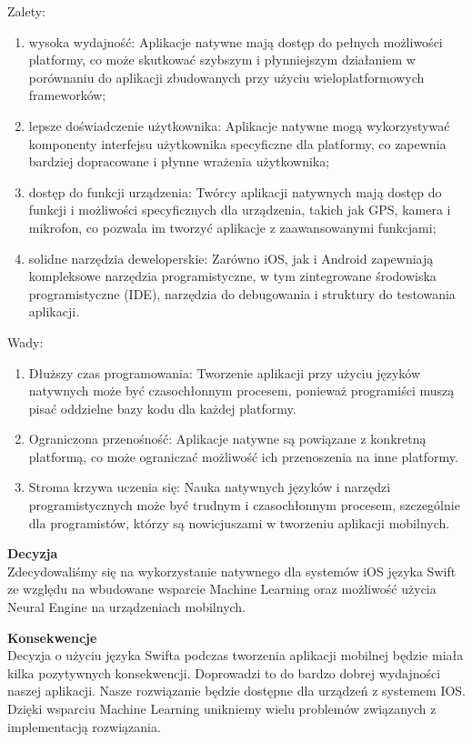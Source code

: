 \documentclass[12pt, a4paper, twoside, openany]{book}
\begin{document}
Zalety:
\begin{enumerate}[label=--]
    \item wysoka wydajność: Aplikacje natywne mają dostęp do pełnych możliwości platformy, co może skutkować szybszym i płynniejszym działaniem w porównaniu do aplikacji zbudowanych przy użyciu wieloplatformowych frameworków;
    \item lepsze doświadczenie użytkownika: Aplikacje natywne mogą wykorzystywać komponenty interfejsu użytkownika specyficzne dla platformy, co zapewnia bardziej dopracowane i płynne wrażenia użytkownika;
    \item dostęp do funkcji urządzenia: Twórcy aplikacji natywnych mają dostęp do funkcji i możliwości specyficznych dla urządzenia, takich jak GPS, kamera i mikrofon, co pozwala im tworzyć aplikacje z zaawansowanymi funkcjami;
    \item solidne narzędzia deweloperskie: Zarówno iOS, jak i Android zapewniają kompleksowe narzędzia programistyczne, w tym zintegrowane środowiska programistyczne (IDE), narzędzia do debugowania i struktury do testowania aplikacji.
\end{enumerate}

Wady:
\begin{enumerate}[label=--]
    \item Dłuższy czas programowania: Tworzenie aplikacji przy użyciu języków natywnych może być czasochłonnym procesem, ponieważ programiści muszą pisać oddzielne bazy kodu dla każdej platformy.
    \item Ograniczona przenośność: Aplikacje natywne są powiązane z konkretną platformą, co może ograniczać możliwość ich przenoszenia na inne platformy.
    \item Stroma krzywa uczenia się: Nauka natywnych języków i narzędzi programistycznych może być trudnym i czasochłonnym procesem, szczególnie dla programistów, którzy są nowicjuszami w tworzeniu aplikacji mobilnych.
\end{enumerate}

\textbf{Decyzja\\}
Zdecydowaliśmy się na wykorzystanie natywnego dla systemów iOS języka Swift ze względu na wbudowane wsparcie Machine Learning oraz możliwość użycia Neural Engine na urządzeniach mobilnych.

\textbf{Konsekwencje\\}
Decyzja o użyciu języka Swifta podczas tworzenia aplikacji mobilnej będzie miała kilka pozytywnych konsekwencji. Doprowadzi to do bardzo dobrej wydajności naszej aplikacji. Nasze rozwiązanie będzie dostępne dla urządzeń z systemem IOS. Dzięki wsparciu Machine Learning unikniemy wielu problemów związanych z implementacją rozwiązania.
\end{document}
